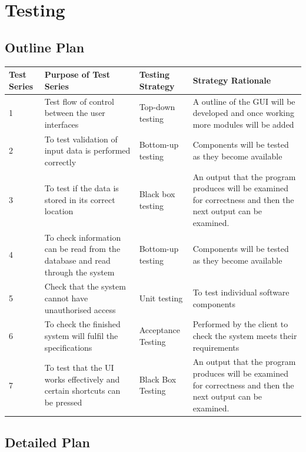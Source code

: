 \section{Testing}

\begin{landscape}
\subsection{Outline Plan}

\begin{center}
    \begin{tabular}{|p{2cm}|p{5cm}|p{5cm}|p{4cm}|}
        \hline
        \textbf{Test Series} & \textbf{Purpose of Test Series} & \textbf{Testing Strategy} & \textbf{Strategy Rationale}\\ \hline
1 & Test flow of control between the user interfaces & Top-down testing & A outline of the GUI will be developed and once working more modules will be added \\ \hline
       2 & To test validation of input data is performed correctly & Bottom-up testing & Components will be tested as they become available \\ \hline
3 & To test if the data is stored in its correct location & Black box testing & An output that the program produces will be examined for correctness and then the next output can be examined.\\ \hline
4 & To check information can be read from the database and read through the system & Bottom-up testing &  Components will be tested as they become available\\ \hline
5 & Check that the system cannot have unauthorised access & Unit testing & To test individual software components \\ \hline
6 & To check the finished system will fulfil the specifications &  Acceptance Testing & Performed by the client to check the system meets their requirements\\ \hline
7 & To test that the UI works effectively and certain shortcuts can be pressed & Black Box Testing & An output that the program produces will be examined for correctness and then the next output can be examined.\\ \hline

    \end{tabular}
\end{center}

\subsection{Detailed Plan}


\end{landscape}
